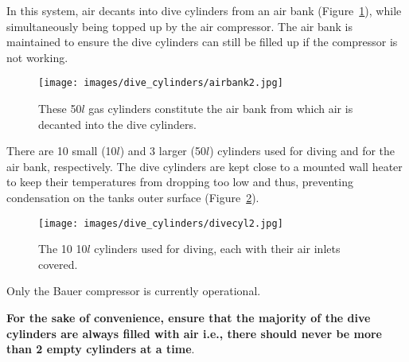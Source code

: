 \documentclass[
  letterpaper,
  DIV=11,
  numbers=noendperiod]{scrreprt}
\begin{document}
In this system, air decants into dive cylinders from an air bank
(Figure~\ref{fig-airbank}), while simultaneously being topped up by the
air compressor. The air bank is maintained to ensure the dive cylinders
can still be filled up if the compressor is not working.

\begin{figure}[H]

{\centering \texttt{[image: images/dive\_cylinders/airbank2.jpg]}

}

\caption{\label{fig-airbank}These 50\(l\) gas cylinders constitute the
air bank from which air is decanted into the dive cylinders.}

\end{figure}

There are 10 small (10\(l\)) and 3 larger (50\(l\)) cylinders used for
diving and for the air bank, respectively. The dive cylinders are kept
close to a mounted wall heater to keep their temperatures from dropping
too low and thus, preventing condensation on the tanks outer surface
(Figure~\ref{fig-divecyl}).

\begin{figure}[H]

{\centering \texttt{[image: images/dive\_cylinders/divecyl2.jpg]}

}

\caption{\label{fig-divecyl}The 10 10\(l\) cylinders used for diving,
each with their air inlets covered.}

\end{figure}

{Only the Bauer compressor is currently operational}.

\textbf{For the sake of convenience, ensure that the majority of the
dive cylinders are always filled with air i.e., there should never be
more than 2 empty cylinders at a time}.
\end{document}
